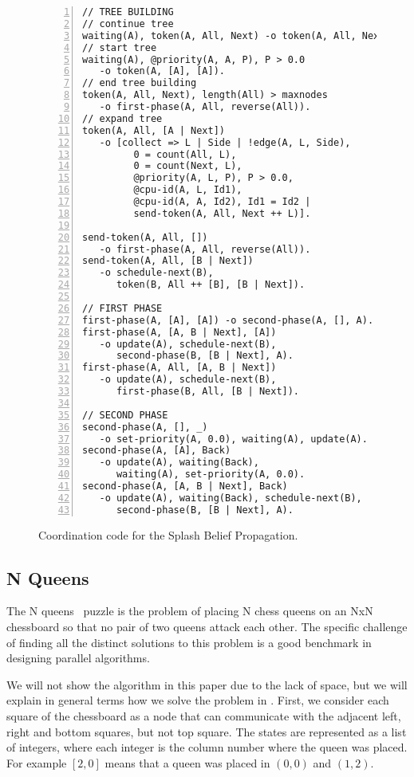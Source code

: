 \begin{figure}[h!]
\small\begin{Verbatim}[numbers=left]
// TREE BUILDING
// continue tree
waiting(A), token(A, All, Next) -o token(A, All, Next).
// start tree
waiting(A), @priority(A, A, P), P > 0.0
   -o token(A, [A], [A]).
// end tree building
token(A, All, Next), length(All) > maxnodes
   -o first-phase(A, All, reverse(All)).
// expand tree
token(A, All, [A | Next])
   -o [collect => L | Side | !edge(A, L, Side),
         0 = count(All, L),
         0 = count(Next, L),
         @priority(A, L, P), P > 0.0,
         @cpu-id(A, L, Id1),
         @cpu-id(A, A, Id2), Id1 = Id2 |
         send-token(A, All, Next ++ L)].

send-token(A, All, [])
   -o first-phase(A, All, reverse(All)).
send-token(A, All, [B | Next])
   -o schedule-next(B),
      token(B, All ++ [B], [B | Next]).

// FIRST PHASE
first-phase(A, [A], [A]) -o second-phase(A, [], A).
first-phase(A, [A, B | Next], [A])
   -o update(A), schedule-next(B),
      second-phase(B, [B | Next], A).
first-phase(A, All, [A, B | Next])
   -o update(A), schedule-next(B),
      first-phase(B, All, [B | Next]).

// SECOND PHASE
second-phase(A, [], _)
   -o set-priority(A, 0.0), waiting(A), update(A).
second-phase(A, [A], Back)
   -o update(A), waiting(Back),
      waiting(A), set-priority(A, 0.0).
second-phase(A, [A, B | Next], Back)
   -o update(A), waiting(Back), schedule-next(B),
      second-phase(B, [B | Next], A).
\end{Verbatim}
  \caption{Coordination code for the Splash Belief Propagation.}
  \label{code:sbp}
\end{figure}
\normalsize

\subsection{N Queens}

The N queens~\cite{8queens} puzzle is the problem of placing N chess queens on an NxN chessboard so
that no pair of two queens attack each other. The specific challenge of finding all the distinct
solutions to this problem is a good benchmark in designing parallel algorithms.

We will not show the algorithm in this paper due to the lack of space, but we will explain in general
terms how we solve the problem in \lang. First, we consider each square of the chessboard as a node
that can communicate with the adjacent left, right and bottom squares, but not top square.
The states are represented as a list of integers, where each integer is the column number where
the queen was placed. For example $[2, 0]$ means that a queen was placed in $(0, 0)$ and $(1, 2)$.

